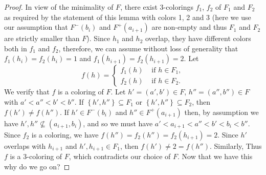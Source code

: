 \documentclass[12pt]{article}
\theoremstyle{definition}
\begin{document}
\begin{proof}
        In view of the minimality of
        $F$, there exist 3-colorings
        $f_1$, $f_2$ of $F_1$ and $F_2$ as required
        by the statement of this lemma
        with colors 1, 2 and 3 (here
        we use our assumption that
        $F^{-}\left(b_{i}\right)$ 
        and $F^{+}\left(a_{i+1}\right)$ 
        are non-empty and thus
        $F_{1}$ and $F_{2}$ are
        strictly smaller than $F$).
        Since $h_1$ and $h_2$ overlap,
        they have different colors
        both in $f_1$ and $f_2$, therefore,
        we can assume without loss of 
        generality that
        $f_1\left(h_{i}\right) = f_2\left(h_{i}\right) = 1$
        and $f_{1}\left(h_{i+1}\right) = 
        f_2\left(h_{i+1}\right) = 2$.
        Let
        \begin{equation*}
            f\left(h\right) = 
            \begin{cases}
                f_1\left(h\right) &\text{ if } h \in F_1, \\
                f_2\left(h\right) &\text{ if } h \in F_{2}.
            \end{cases}
        \end{equation*}
        We verify that $f$ 
        is a coloring of $F$. Let
        $h' = \left(a', b'\right) \in F$,
        $h'' = \left(a'', b''\right) \in F$
        with $a' < a'' < b' < b''$.
        If $\left\{h', h''\right\} \subseteq F_1$ 
        or $\left\{h', h''\right\} \subseteq F_2$,
        then $f\left(h'\right) \neq 
        f\left(h''\right)$.
        If $h' \in F^{-}\left(b_{i}\right)$ 
        and $h'' \in F^{+}\left(a_{i+1}\right)$
        then, by assumption
        we have
        $h', h'' \not \subseteq \left(a_{i+1}, b_{i}\right)$,
        and so we must have $a' < a_{i+1} < 
        a'' < b' < b_{i} < b''$. 
        Since $f_2$ is a coloring,
        we have $f\left(h''\right) =
        f_2\left(h''\right) =
        f_2\left(h_{i+1}\right) = 2$.
        Since $h'$ overlaps with $h_{i+1}$
        and $h', h_{i+1}
        \in F_1$, then $f\left(h'\right)
        \neq 2 = f\left(h''\right)$.
        Similarly, 
        Thus
        $f$ is a 3-coloring of $F$,
        which contradicts our choice of $F$.
        {Now that we have this
        why do we go on?}


\end{proof}
\end{document}
